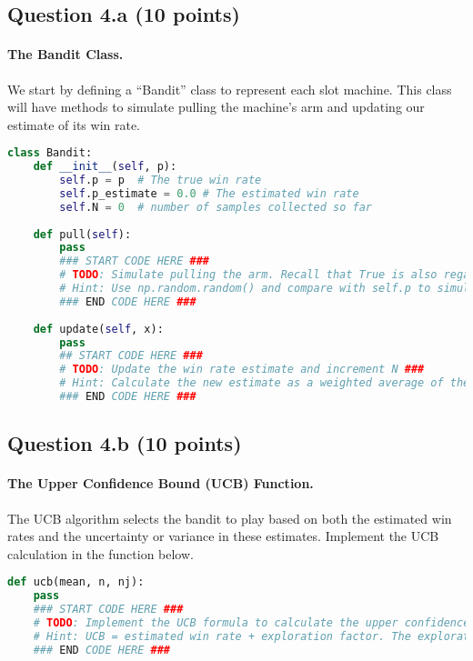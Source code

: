 \documentclass[12pt]{article}
\begin{document}
\subsection*{Question 4.a (10 points) } 
\paragraph{The Bandit Class.} We start by defining a ``Bandit'' class to represent each slot machine. This class will have methods to simulate pulling the machine's arm and updating our estimate of its win rate.

\begin{solution}
\begin{lstlisting}[language=Python]
class Bandit:
    def __init__(self, p):
        self.p = p  # The true win rate
        self.p_estimate = 0.0 # The estimated win rate
        self.N = 0  # number of samples collected so far
    
    def pull(self):
        pass
        ### START CODE HERE ###
        # TODO: Simulate pulling the arm. Recall that True is also regarded as 1 and False is regarded as 0 ###
        # Hint: Use np.random.random() and compare with self.p to simulate a dense probability distribution
        ### END CODE HERE ###
    
    def update(self, x):
        pass
        ## START CODE HERE ###
        # TODO: Update the win rate estimate and increment N ###
        # Hint: Calculate the new estimate as a weighted average of the old estimate and the new sample `x`
        ### END CODE HERE ###
\end{lstlisting}
\end{solution}

\subsection*{Question 4.b (10 points) } 
\paragraph{The Upper Confidence Bound (UCB) Function.}
The UCB algorithm selects the bandit to play based on both the estimated win rates and the uncertainty or variance in these estimates. Implement the UCB calculation in the function below.
\begin{solution}
\begin{lstlisting}[language=Python]
def ucb(mean, n, nj):
    pass
    ### START CODE HERE ###
    # TODO: Implement the UCB formula to calculate the upper confidence bound ###
    # Hint: UCB = estimated win rate + exploration factor. The exploration factor can be calculated using np.sqrt(2 * np.log(n) / nj)
    ### END CODE HERE ###
\end{lstlisting}
\end{solution}
\end{document}
